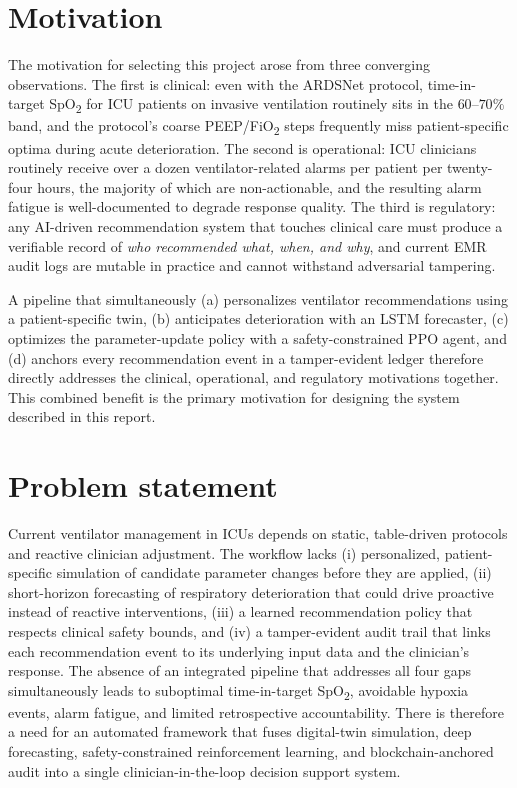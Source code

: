 \documentclass[12pt,a4paper,oneside]{report}
\begin{document}
\section{Motivation}
The motivation for selecting this project arose from three converging observations. The first is clinical: even with the ARDSNet protocol, time-in-target SpO\textsubscript{2} for ICU patients on invasive ventilation routinely sits in the $60\text{--}70\%$ band, and the protocol's coarse PEEP/FiO\textsubscript{2} steps frequently miss patient-specific optima during acute deterioration. The second is operational: ICU clinicians routinely receive over a dozen ventilator-related alarms per patient per twenty-four hours, the majority of which are non-actionable, and the resulting alarm fatigue is well-documented to degrade response quality. The third is regulatory: any AI-driven recommendation system that touches clinical care must produce a verifiable record of \emph{who recommended what, when, and why}, and current EMR audit logs are mutable in practice and cannot withstand adversarial tampering.

A pipeline that simultaneously (a) personalizes ventilator recommendations using a patient-specific twin, (b) anticipates deterioration with an LSTM forecaster, (c) optimizes the parameter-update policy with a safety-constrained PPO agent, and (d) anchors every recommendation event in a tamper-evident ledger therefore directly addresses the clinical, operational, and regulatory motivations together. This combined benefit is the primary motivation for designing the system described in this report.

\section{Problem statement}
Current ventilator management in ICUs depends on static, table-driven protocols and reactive clinician adjustment. The workflow lacks (i) personalized, patient-specific simulation of candidate parameter changes before they are applied, (ii) short-horizon forecasting of respiratory deterioration that could drive proactive instead of reactive interventions, (iii) a learned recommendation policy that respects clinical safety bounds, and (iv) a tamper-evident audit trail that links each recommendation event to its underlying input data and the clinician's response. The absence of an integrated pipeline that addresses all four gaps simultaneously leads to suboptimal time-in-target SpO\textsubscript{2}, avoidable hypoxia events, alarm fatigue, and limited retrospective accountability. There is therefore a need for an automated framework that fuses digital-twin simulation, deep forecasting, safety-constrained reinforcement learning, and blockchain-anchored audit into a single clinician-in-the-loop decision support system.
\end{document}
